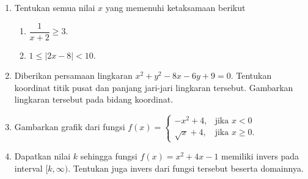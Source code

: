\documentclass[10pt,openany,a4paper]{article}
\theoremstyle{definition}
\theoremstyle{definition}
\theoremstyle{plain}
\begin{document}
        \begin{enumerate}
            \item Tentukan semua nilai $x$ yang memenuhi ketaksamaan berikut
            \begin{enumerate}
                \item $\dfrac{1}{x+2}\geq 3$.
                \item $1\leq |2x-8|<10$.
            \end{enumerate}
            \item Diberikan persamaan lingkaran $x^2+y^2-8x-6y+9=0$. Tentukan koordinat titik pusat dan panjang jari-jari lingkaran tersebut. Gambarkan lingkaran tersebut pada bidang koordinat.
            \item Gambarkan grafik dari fungsi $f(x)=\begin{cases}
    -x^2+4, & \text{jika } x<0\\
    \sqrt{x}+4, & \text{jika } x\geq 0.
    \end{cases}$
            \item Dapatkan nilai $k$ sehingga fungsi $f(x)=x^2+4x-1$ memiliki invers pada interval $[k,\infty)$. Tentukan juga invers dari fungsi tersebut beserta domainnya.
        \end{enumerate}


    
\end{document}
